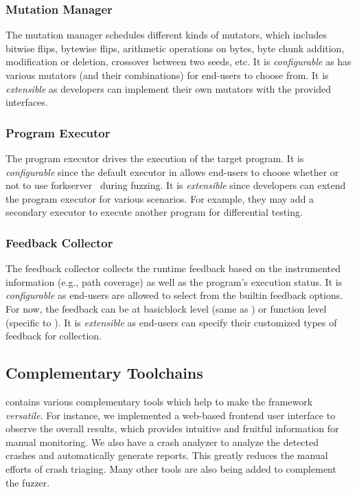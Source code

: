 \subsubsection{Mutation Manager}
The mutation manager schedules different kinds of mutators, which includes bitwise flips, bytewise flips, arithmetic operations on bytes, byte chunk addition, modification or deletion, crossover between two seeds, etc.
It is \textit{configurable} as {\FOT} has various mutators (and their combinations) for end-users to choose from.
It is \textit{extensible} as developers can implement their own mutators with the provided interfaces.

\subsubsection{Program Executor}
The program executor drives the execution of the target program.
It is \textit{configurable} since the default executor in {\FOT} allows end-users to choose whether or not to use forkserver~\cite{afl} during fuzzing.
It is \textit{extensible} since developers can extend the program executor for various scenarios.
For example, they may add a secondary executor to execute another program for differential testing.

\subsubsection{Feedback Collector}
The feedback collector collects the runtime feedback based on the instrumented information (e.g., path coverage) as well as the program's execution status.
It is \textit{configurable} as end-users are allowed to select from the builtin feedback options.
For now, the feedback can be at basicblock level (same as {\AFL}) or function level (specific to \FOT).
It is \textit{extensible} as end-users can specify their customized types of feedback for collection.

\subsection{Complementary Toolchains}
{\FOT} contains various complementary tools which help to make the framework \textit{versatile}.
For instance, we implemented a web-based frontend user interface to observe the overall results, which provides intuitive and fruitful information for manual monitoring.
We also have a crash analyzer to analyze the detected crashes and automatically generate reports.
This greatly reduces the manual efforts of crash triaging.
Many other tools are also being added to complement the fuzzer.


